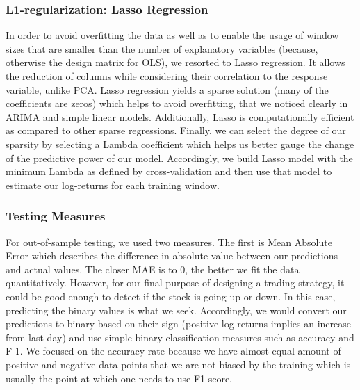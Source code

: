 \subsubsection{L1-regularization: Lasso Regression}
In order to avoid overfitting the data as well as to enable the usage of window sizes that are smaller than the number of explanatory variables (because, otherwise the design matrix for OLS), we resorted to Lasso regression.\cite{glmnet} It allows the reduction of columns while considering their correlation to the response variable, unlike PCA. Lasso regression yields a sparse solution (many of the coefficients are zeros) which helps to avoid overfitting, that we noticed clearly in ARIMA and simple linear models. Additionally, Lasso is computationally efficient as compared to other sparse regressions.\cite{glmnet} Finally, we can select the degree of our sparsity by selecting a Lambda coefficient which helps us better gauge the change of the predictive power of our model.
Accordingly, we build Lasso model with the minimum Lambda as defined by cross-validation and then use that model to estimate our log-returns for each training window.
\subsubsection{Testing Measures}
For out-of-sample testing, we used two measures. The first is Mean Absolute Error which describes the difference in absolute value between our predictions and actual values. The closer MAE is to 0, the better we fit the data quantitatively. However, for our final purpose of designing a trading strategy, it could be good enough to detect if the stock is going up or down. In this case, predicting the binary values is what we seek. Accordingly, we would convert our predictions to binary based on their sign (positive log returns implies an increase from last day) and use simple binary-classification measures such as accuracy and F-1. We focused on the accuracy rate because we have almost equal amount of positive and negative data points that we are not biased by the training which is usually the point at which one needs to use F1-score.
